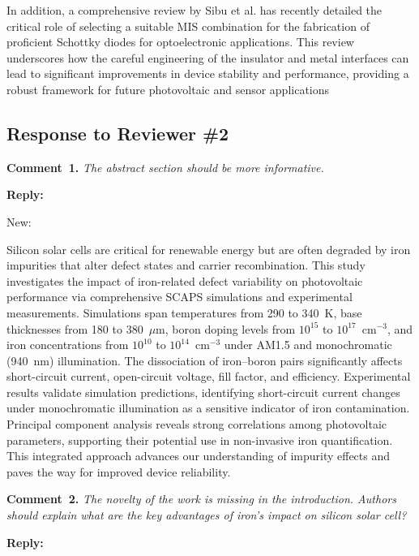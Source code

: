 \documentclass[a4paper,fleqn]{cas-sc}
\begin{document}
In addition, a comprehensive review by Sibu et al. has recently detailed the critical role of selecting a suitable MIS combination for the fabrication of proficient Schottky diodes for optoelectronic applications. This review underscores how the careful engineering of the insulator and metal interfaces can lead to significant improvements in device stability and performance, providing a robust framework for future photovoltaic and sensor applications



\subsection*{Response to Reviewer \#2 }

\noindent
\textcolor[rgb]{0.00,0.50,1.00}{\textbf{Comment~1.}}
\emph{The abstract section should be more informative.}

\noindent
\textcolor[rgb]{0.51,0.00,0.00}{\textbf{Reply:}}

New:

Silicon solar cells are critical for renewable energy but are often degraded by iron impurities that alter defect states and carrier recombination. This study investigates the impact of iron-related defect variability on photovoltaic performance via comprehensive SCAPS simulations and experimental measurements. Simulations span temperatures from 290 to 340~K, base thicknesses from 180 to 380~$\mu$m, boron doping levels from $10^{15}$ to $10^{17}$~cm$^{-3}$, and iron concentrations from $10^{10}$ to $10^{14}$~cm$^{-3}$ under AM1.5 and monochromatic (940~nm) illumination. The dissociation of iron–boron pairs significantly affects short-circuit current, open-circuit voltage, fill factor, and efficiency. Experimental results validate simulation predictions, identifying short-circuit current changes under monochromatic illumination as a sensitive indicator of iron contamination. Principal component analysis reveals strong correlations among photovoltaic parameters, supporting their potential use in non-invasive iron quantification. This integrated approach advances our understanding of impurity effects and paves the way for improved device reliability.


\noindent
\textcolor[rgb]{0.00,0.50,1.00}{\textbf{Comment~2.}}
\emph{The novelty of the work is missing in the introduction. Authors should explain what are the key advantages of iron's impact on silicon solar cell?}

\noindent
\textcolor[rgb]{0.51,0.00,0.00}{\textbf{Reply:}}
\end{document}
